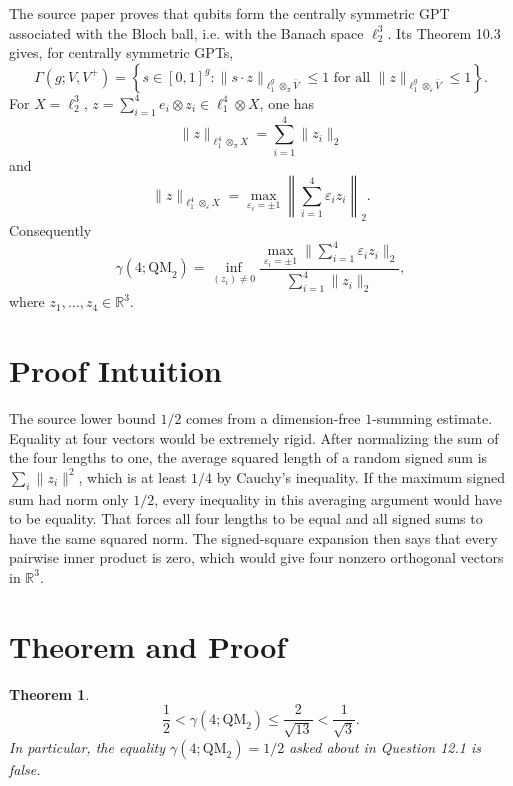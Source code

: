 \documentclass[11pt]{article}
\newtheorem{theorem}{Theorem}
\begin{document}
The source paper proves that qubits form the centrally symmetric GPT associated with the
Bloch ball, i.e. with the Banach space \(\ell_2^3\).  Its Theorem 10.3 gives, for centrally
symmetric GPTs,
\[
\Gamma(g;V,V^+)=
\left\{s\in[0,1]^g:
\|s\cdot z\|_{\ell_1^g\otimes_\pi \bar V}\leq 1
\text{ for all } \|z\|_{\ell_1^g\otimes_\varepsilon \bar V}\leq 1
\right\}.
\]
For \(X=\ell_2^3\), \(z=\sum_{i=1}^4 e_i\otimes z_i\in\ell_1^4\otimes X\), one has
\[
\|z\|_{\ell_1^4\otimes_\pi X}=\sum_{i=1}^4 \|z_i\|_2
\]
and
\[
\|z\|_{\ell_1^4\otimes_\varepsilon X}
=\max_{\varepsilon_i=\pm1}\left\|\sum_{i=1}^4\varepsilon_i z_i\right\|_2.
\]
Consequently
\[
\gamma(4;\mathrm{QM}_2)=
\inf_{(z_i)\ne 0}
\frac{\max_{\varepsilon_i=\pm1}\|\sum_{i=1}^4\varepsilon_i z_i\|_2}
{\sum_{i=1}^4\|z_i\|_2},
\]
where \(z_1,\dots,z_4\in\mathbb R^3\).

\section*{Proof Intuition}

The source lower bound \(1/2\) comes from a dimension-free \(1\)-summing estimate.  Equality
at four vectors would be extremely rigid.  After normalizing the sum of the four lengths to
one, the average squared length of a random signed sum is \(\sum_i\|z_i\|^2\), which is at least
\(1/4\) by Cauchy's inequality.  If the maximum signed sum had norm only \(1/2\), every
inequality in this averaging argument would have to be equality.  That forces all four lengths
to be equal and all signed sums to have the same squared norm.  The signed-square expansion
then says that every pairwise inner product is zero, which would give four nonzero orthogonal
vectors in \(\mathbb R^3\).

\section*{Theorem and Proof}

\begin{theorem}
\[
\frac12<\gamma(4;\mathrm{QM}_2)\leq \frac{2}{\sqrt{13}}<\frac1{\sqrt3}.
\]
In particular, the equality \(\gamma(4;\mathrm{QM}_2)=1/2\) asked about in Question 12.1 is
false.
\end{theorem}
\end{document}
